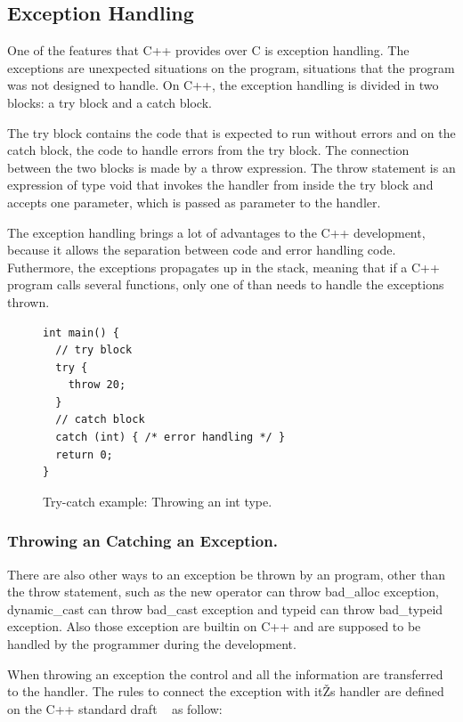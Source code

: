 \documentclass[a4paper]{llncs}
\begin{document}
\subsection{Exception Handling}

One of the features that C++ provides over C is exception handling. The exceptions are unexpected situations on the program, situations 
that the program was not designed to handle. On C++, the exception handling is divided in two blocks: a try block and a catch block. 

The try block contains the code that is expected to run without errors and on the catch block, the code to handle errors from the try 
block. The connection between the two blocks is made by a throw expression. The throw statement is an expression of type void that 
invokes the handler from inside the try block and accepts one parameter, which is passed as parameter to the handler.

The exception handling brings a lot of advantages to the C++ development, because it allows the separation between code and error 
handling code. Futhermore, the exceptions propagates up in the stack, meaning that if a C++ program calls several functions, only 
one of than needs to handle the exceptions thrown.

\begin{figure}[ht]
\centering
\begin{minipage}{0.7\textwidth}
\begin{lstlisting}
int main() {
  // try block
  try {
    throw 20;
  }
  // catch block
  catch (int) { /* error handling */ }
  return 0;
}
\end{lstlisting}
\end{minipage}
\caption{Try-catch example: Throwing an int type.}
\label{figure:try-catch-example}
\end{figure}

\subsubsection{Throwing an Catching an Exception.}

There are also other ways to an exception be thrown by an program, other than the throw statement, such as the new operator can throw 
bad\_alloc exception, dynamic\_cast can throw bad\_cast exception and typeid can throw bad\_typeid exception. Also those exception are 
builtin on C++ and are supposed to be handled by the programmer during the development.

When throwing an exception the control and all the information are transferred to the handler. The rules to connect the exception with itŽs
handler are defined on the C++ standard draft ~\cite{CppDraft} as follow:
\end{document}

